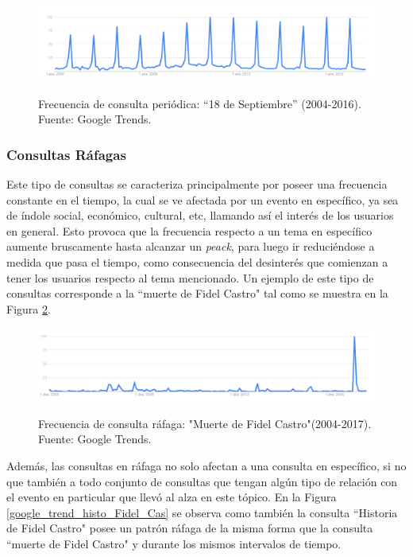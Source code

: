 \documentclass[12pt]{ociamthesis}  %
\begin{document}
\begin{figure}[!htb]
	\centering
	\includegraphics[width=15cm]{18_sept_google_trend.png}\\
	\caption{Frecuencia de consulta periódica: ``18 de Septiembre'' (2004-2016). Fuente: Google Trends.}
	\label{fig:mesh1}
\end{figure}

\subsubsection{Consultas Ráfagas}
Este tipo de consultas se caracteriza principalmente por poseer una frecuencia constante en el tiempo, la cual se ve afectada por un evento en específico, ya sea de índole social, económico, cultural, etc, llamando así el interés de los usuarios en general. Esto provoca que la frecuencia respecto a un tema en específico aumente bruscamente hasta alcanzar un \textit{peack}, para luego ir reduciéndose a medida que pasa el tiempo, como consecuencia del desinterés que comienzan a tener los usuarios respecto al tema mencionado. Un ejemplo de este tipo de consultas corresponde a la ``muerte de Fidel Castro" tal como se muestra en la Figura \ref{google_trend_muerte_Fidel_Cast}.\\

\begin{figure}[!htb]
	\centering
	\includegraphics[width=15cm]{muerte_fidel_castro.png}\\
	\caption{Frecuencia de consulta ráfaga: "Muerte de Fidel Castro"(2004-2017). Fuente: Google Trends.}
	\label{google_trend_muerte_Fidel_Cast}
\end{figure}

Además, las consultas en ráfaga no solo afectan a una consulta en específico, si no que también a todo conjunto de consultas que tengan algún tipo de relación con el evento en particular que llevó al alza en este tópico. En la Figura \ref{google_trend_histo_Fidel_Cas} se observa como también la consulta ``Historia de Fidel Castro" posee un patrón ráfaga de la misma forma que la consulta ``muerte de Fidel Castro" y durante los mismos intervalos de tiempo.\\
\end{document}
